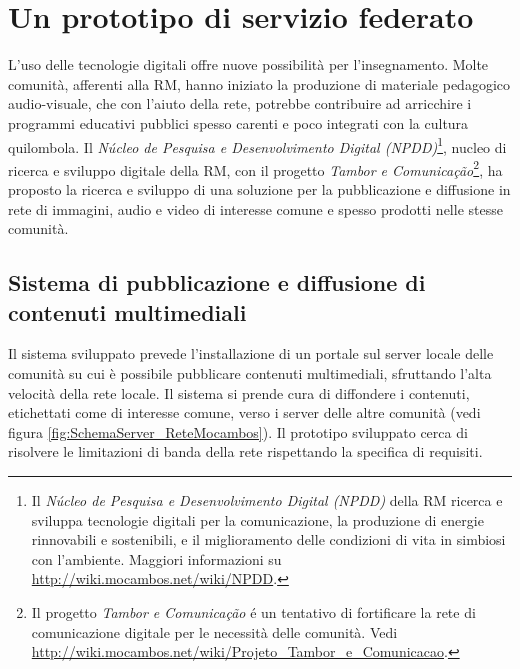 
\chapter{Un prototipo di servizio federato}
\label{Capitolo4}

L'uso delle tecnologie digitali offre nuove possibilità per
l'insegnamento. Molte comunità, afferenti alla RM, hanno iniziato la
produzione di materiale pedagogico audio-visuale, che con l'aiuto
della rete, potrebbe contribuire ad arricchire i programmi educativi
pubblici spesso carenti e poco integrati con la cultura quilombola. Il
\emph{Núcleo de Pesquisa e Desenvolvimento Digital (NPDD)}\footnote{Il
  \emph{Núcleo de Pesquisa e Desenvolvimento Digital (NPDD)} della RM
  ricerca e sviluppa tecnologie digitali per la comunicazione, la
  produzione di energie rinnovabili e sostenibili, e il miglioramento
  delle condizioni di vita in simbiosi con l'ambiente. Maggiori
  informazioni su \url{http://wiki.mocambos.net/wiki/NPDD}.}, nucleo
di ricerca e sviluppo digitale della RM, con il progetto \emph{Tambor
  e Comunicação}\footnote{Il progetto \emph{Tambor e Comunicação} é un
  tentativo di fortificare la rete di comunicazione digitale per le
  necessità delle comunità. Vedi
  \url{http://wiki.mocambos.net/wiki/Projeto_Tambor_e_Comunicacao}.},
ha proposto la ricerca e sviluppo di una soluzione per la
pubblicazione e diffusione in rete di immagini, audio e video di
interesse comune e spesso prodotti nelle stesse comunità.

\section{Sistema di pubblicazione e diffusione di contenuti
  multimediali}
Il sistema sviluppato prevede l'installazione di un portale sul server
locale delle comunità su cui è possibile pubblicare contenuti
multimediali, sfruttando l'alta velocità della rete locale. Il sistema
si prende cura di diffondere i contenuti, etichettati come di
interesse comune, verso i server delle altre comunità (vedi figura
\ref{fig:SchemaServer_ReteMocambos}). Il prototipo sviluppato cerca di
risolvere le limitazioni di banda della rete rispettando la specifica
di requisiti.

